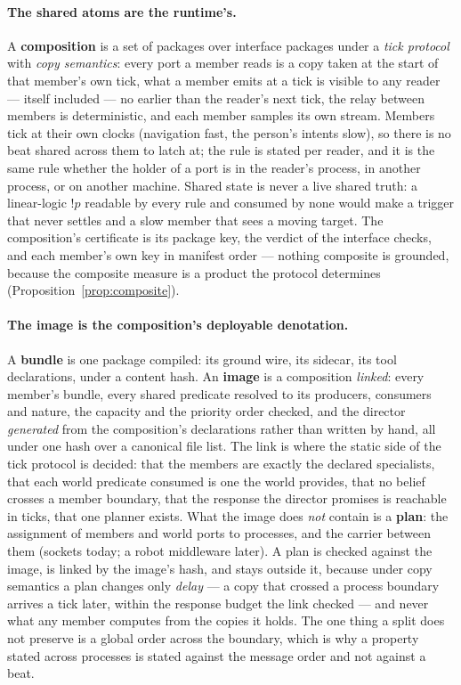 \documentclass[11pt]{article}
\newcommand{\bang}{\mathord{!}}
\theoremstyle{plain}
\theoremstyle{definition}
\theoremstyle{remark}
\begin{document}
\paragraph{The shared atoms are the runtime's.} A \textbf{composition}
is a set of packages over interface packages under a \emph{tick
protocol} with \emph{copy semantics}: every port a member reads is a
copy taken at the start of that member's own tick, what a member emits
at a tick is visible to any reader --- itself included --- no earlier
than the reader's next tick, the relay between members is deterministic,
and each member samples its own stream. Members tick at their own
clocks (navigation fast, the person's intents slow), so there is no
beat shared across them to latch at; the rule is stated per reader, and
it is the same rule whether the holder of a port is in the reader's
process, in another process, or on another machine. Shared state is
never a live shared truth: a linear-logic $\bang p$ readable by every
rule and consumed by none would make a trigger that never settles and a
slow member that sees a moving target. The composition's certificate is its package key, the verdict
of the interface checks, and each member's own key in manifest order
--- nothing composite is grounded, because the composite measure is a
product the protocol determines (Proposition~\ref{prop:composite}).

\paragraph{The image is the composition's deployable denotation.} A
\textbf{bundle} is one package compiled: its ground wire, its sidecar,
its tool declarations, under a content hash. An \textbf{image} is a
composition \emph{linked}: every member's bundle, every shared
predicate resolved to its producers, consumers and nature, the capacity
and the priority order checked, and the director \emph{generated} from
the composition's declarations rather than written by hand, all under
one hash over a canonical file list. The link is where the static side
of the tick protocol is decided: that the members are exactly the
declared specialists, that each world predicate consumed is one the
world provides, that no belief crosses a member boundary, that the
response the director promises is reachable in ticks, that one planner
exists. What the image does \emph{not} contain is a \textbf{plan}: the
assignment of members and world ports to processes, and the carrier
between them (sockets today; a robot middleware later). A plan is
checked against the image, is linked by the image's hash, and stays
outside it, because under copy semantics a plan changes only
\emph{delay} --- a copy that crossed a process boundary arrives a tick
later, within the response budget the link checked --- and never what
any member computes from the copies it holds. The one thing a split
does not preserve is a global order across the boundary, which is why a
property stated across processes is stated against the message order
and not against a beat.
\end{document}

